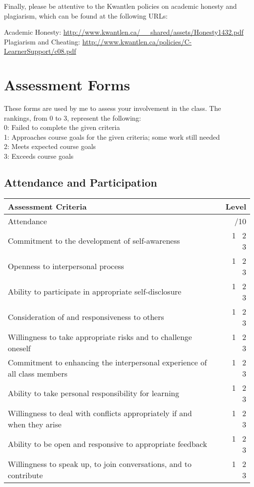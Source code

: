 \documentclass[letterpaper,10pt,headsepline]{scrreprt}
\begin{document}
Finally, please be attentive to the Kwantlen policies on academic honesty and plagiarism, which can be found at the following URLs:

\noindent
Academic Honesty: \url{http://www.kwantlen.ca/__shared/assets/Honesty1432.pdf}\\
Plagiarism and Cheating: \url{http://www.kwantlen.ca/policies/C-LearnerSupport/c08.pdf}

\section{Assessment Forms}
These forms are used by me to assess your involvement in the class. The rankings, from 0 to 3, represent the following:\\
0: Failed to complete the given criteria\\
1: Approaches course goals for the given criteria; some work still needed\\
2: Meets expected course goals\\
3: Exceeds course goals\\
\subsection{Attendance and Participation}
\begin{tabular}{|l|r|}
\hline
Assessment Criteria & Level\\
\hline
Attendance &  /10\\
Commitment to the development of self-awareness & \ 1 \ 2 \ 3 \\
Openness to interpersonal process & \ 1 \ 2 \ 3 \\
Ability to participate in appropriate self-disclosure & \ 1 \ 2 \ 3 \\ 
Consideration of and responsiveness to others & \ 1 \ 2 \ 3 \\
Willingness to take appropriate risks and to challenge oneself & \ 1 \ 2 \ 3 \\ 
Commitment to enhancing the interpersonal experience of all class members & \ 1 \ 2 \ 3 \\ 
Ability to take personal responsibility for learning & \ 1 \ 2 \ 3 \\
Willingness to deal with conflicts appropriately if and when they arise & \ 1 \ 2 \ 3 \\ 
Ability to be open and responsive to appropriate feedback & \ 1 \ 2 \ 3 \\
Willingness to speak up, to join conversations, and to contribute & \ 1 \ 2 \ 3 \\
\hline
\end{tabular}
\end{document}
